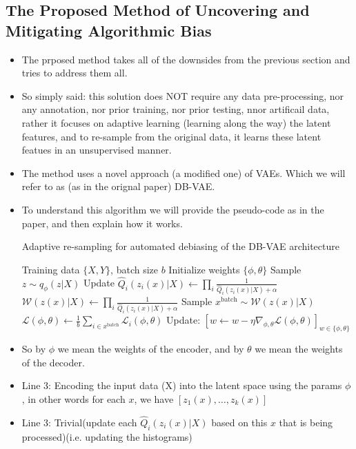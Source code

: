 \documentclass{article}
\begin{document}
\subsection{The Proposed Method of Uncovering and Mitigating Algorithmic Bias}
\begin{itemize}
  \item The prposed method takes all of the downsides from the previous section and tries to address them all. 
  \item So simply said: this solution does NOT require any data pre-processing, nor any annotation, nor prior training, nor prior testing, nnor artificail data, rather it focuses on adaptive learning (learning along the way) the latent features, and to re-sample from the original data, it learns these latent featues in an unsupervised manner. 
  \item The method uses a novel approach (a modified one) of VAEs. Which we will refer to as (as in the orignal paper) DB-VAE.
  \item To understand this algorithm we will provide the pseudo-code as in the paper, and then explain how it works.
  \begin{algorithm}[H]
    \caption{Adaptive re-sampling for automated debiasing of the DB-VAE architecture}
    \begin{algorithmic}[1]
    \Require Training data $\{X, Y\}$, batch size $b$
    \State Initialize weights $\{\phi, \theta\}$
        \State Sample $z \sim q_{\phi}(z|X)$
        \State Update $\hat{Q}_i(z_i(x)|X) \leftarrow \prod_i \frac{1}{\hat{Q}_i(z_i(x)|X) + \alpha}$
        \State $\mathcal{W}(z(x)|X) \leftarrow \prod_i \frac{1}{\hat{Q}_i(z_i(x)|X) + \alpha}$
            \State Sample $x^{\text{batch}} \sim \mathcal{W}(z(x)|X)$
            \State $\mathcal{L}(\phi, \theta) \leftarrow \frac{1}{b} \sum_{i \in x^{\text{batch}}} \mathcal{L}_i(\phi, \theta)$
            \State Update: $[w \leftarrow w - \eta \nabla_{\phi, \theta} \mathcal{L}(\phi, \theta)]_{w \in \{\phi, \theta\}}$
        \EndWhile
    \EndFor
    \end{algorithmic}
    \end{algorithm}
\item So by $\phi$ we mean the weights of the encoder, and by $\theta$ we mean the weights of the decoder.
\item Line 3: Encoding the input data (X) into the latent space using the params $\phi$, in other words for each $x$, we have $[z_1(x), \ldots, z_k(x)]$
\item Line 3: Trivial(update each $\hat{Q}_i(z_i(x)|X)$ based on this $x$ that is being processed)(i.e. updating the histograms)

\end{itemize}
\end{document}
